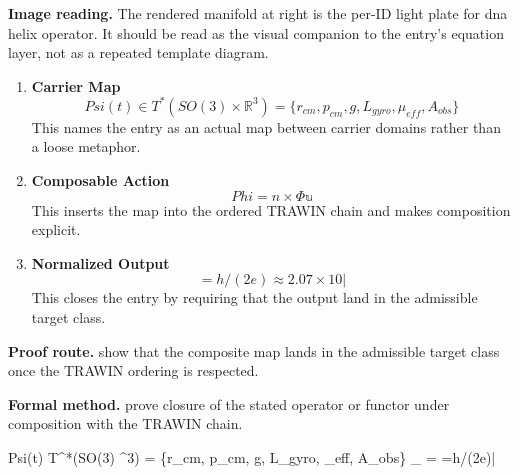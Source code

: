 \begin{samepage}
\noindent\begin{minipage}[t]{0.45\linewidth}
\vspace{0pt}
\raggedright
\scriptsize\textbf{Image reading.} The rendered manifold at right is the per-ID light plate for dna helix operator. It should be read as the visual companion to the entry's equation layer, not as a repeated template diagram.\par
\end{minipage}\hfill
\begin{minipage}[t]{0.53\linewidth}
\vspace*{-0.10in}
\raggedright
{}
\end{minipage}
\end{samepage}

\clearpage


\begin{enumerate}[leftmargin=1.6em,itemsep=9pt,topsep=6pt]
\item \textbf{Carrier Map}
\[
Psi(t) \in T^*(SO(3) \times \mathbb{R}^3) = \{r_{cm}, p_{cm}, g, L_{gyro}, \mu_{eff}, A_{obs}\}
\]
This names the entry as an actual map between carrier domains rather than a loose metaphor.

\item \textbf{Composable Action}
\[
Phi=n\times\Phi\mathbb{u}
\]
This inserts the map into the ordered TRAWIN chain and makes composition explicit.

\item \textbf{Normalized Output}
\[
=h/(2e)\approx2.07\times10|
\]
This closes the entry by requiring that the output land in the admissible target class.
\end{enumerate}

\textbf{Proof route.} show that the composite map lands in the admissible target class once the TRAWIN ordering is respected.

\textbf{Formal method.} prove closure of the stated operator or functor under composition with the TRAWIN chain.

\medskip
{}

\begin{tzpsnapshot}
\end{tzpsnapshot}

\tzpequationlinks
  {Psi(t) \in T^*(SO(3) \times {}^3) = \{r_{cm}, p_{cm}, g, L_{gyro}, \mu_{eff}, A_{obs}\}}
  {_{} = \cdots}
  {=h/(2e)|}
